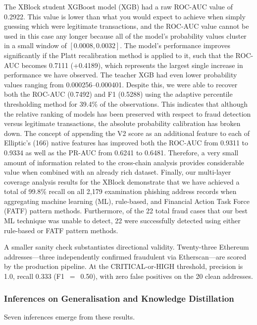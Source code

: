 \documentclass[journal]{IEEEtran}
\begin{document}
The XBlock student XGBoost model (XGB) had a raw ROC-AUC value of 0.2922. This value is lower than what you would expect to achieve when simply guessing which were legitimate transactions, and the ROC-AUC value cannot be used in this case any longer because all of the model's probability values cluster in a small window of $[0.0008, 0.0032]$. The model's performance improves significantly if the Platt recalibration method is applied to it, such that the ROC-AUC becomes 0.7111 (+0.4189), which represents the largest single increase in performance we have observed. The teacher XGB had even lower probability values ranging from 0.000256--0.000401. Despite this, we were able to recover both the ROC-AUC (0.7492) and F1 (0.5288) using the adaptive percentile thresholding method for 39.4\% of the observations. This indicates that although the relative ranking of models has been preserved with respect to fraud detection versus legitimate transactions, the absolute probability calibration has broken down. The concept of appending the V2 score as an additional feature to each of Elliptic's (166) native features has improved both the ROC-AUC from 0.9311 to 0.9334 as well as the PR-AUC from 0.6241 to 0.6481. Therefore, a very small amount of information related to the cross-chain analysis provides considerable value when combined with an already rich dataset. Finally, our multi-layer coverage analysis results for the XBlock demonstrate that we have achieved a total of 99.8\% recall on all 2,179 examination phishing address records when aggregating machine learning (ML), rule-based, and Financial Action Task Force (FATF) pattern methods. Furthermore, of the 22 total fraud cases that our best ML technique was unable to detect, 22 were successfully detected using either rule-based or FATF pattern methods.

A smaller sanity check substantiates directional validity. Twenty-three Ethereum addresses---three independently confirmed fraudulent via Etherscan---are scored by the production pipeline. At the CRITICAL-or-HIGH threshold, precision is 1.0, recall 0.333 (F1~$=$~0.50), with zero false positives on the 20 clean addresses.

\subsubsection{Inferences on Generalisation and Knowledge Distillation}

Seven inferences emerge from these results.
\end{document}
